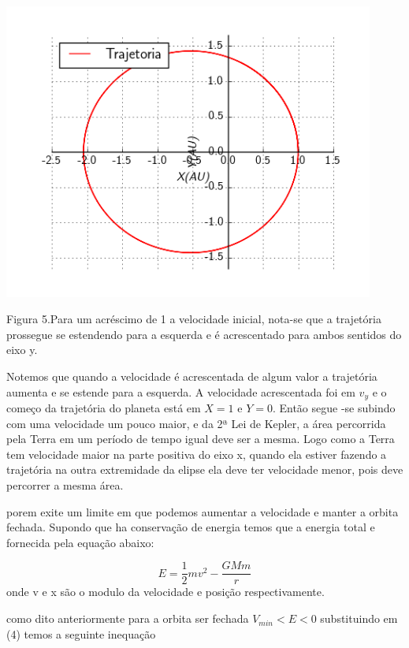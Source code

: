 \documentclass[a4paper]{article} %
\begin{document}
\begin{center}
	\includegraphics[width=4.80in,height=3.84in, keepaspectratio=false]{image4_15-50-59-718000.png}
	
	\scriptsize{Figura 5.Para um acréscimo de 1 a velocidade inicial, nota-se que a trajetória prossegue se estendendo para a esquerda e é acrescentado para ambos sentidos do eixo y.}
	
\end{center}

Notemos que quando a velocidade é acrescentada de algum valor a trajetória aumenta e se estende para a esquerda. A velocidade acrescentada foi em $v_y$ e o começo da trajetória do planeta está em $X=1$ e $Y=0$. Então segue -se subindo com uma velocidade um pouco maior, e da 2ª Lei de Kepler, a área percorrida pela Terra em um período de tempo igual deve ser a mesma. Logo como a Terra tem velocidade maior na parte positiva do eixo x, quando ela estiver fazendo a trajetória na outra extremidade da elipse ela deve ter velocidade menor, pois deve percorrer a mesma área.

porem exite um limite em que podemos aumentar a velocidade e manter a orbita fechada. Supondo que ha conservação de energia temos que a energia total e fornecida pela equação abaixo:

\begin{equation}
	E = \frac{1}{2}mv^2 - \frac{GMm}{r}
\end{equation} 
onde v e x são o modulo da velocidade e posição respectivamente.

como dito anteriormente para a orbita ser fechada $V_{min}< E < 0$ substituindo em (4) temos a seguinte inequação
\end{document}
